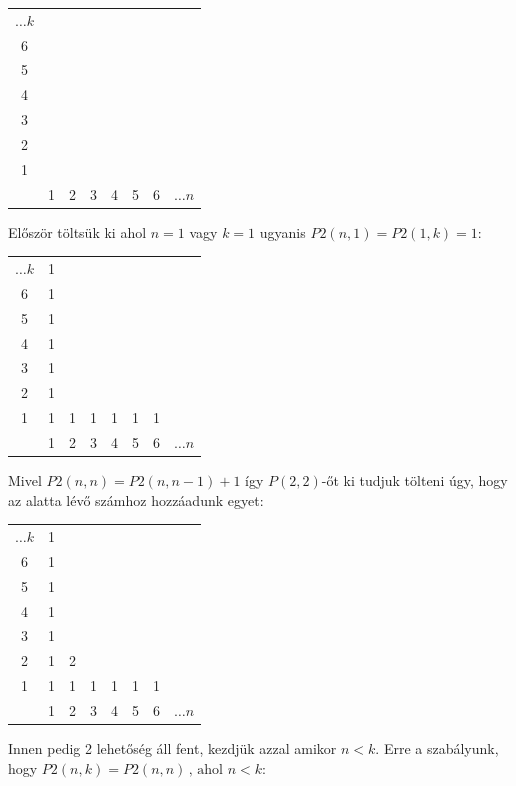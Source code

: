 \documentclass{article}
\theoremstyle{mytheoremstyle}
\theoremstyle{mytheoremstyle}
\theoremstyle{myproblemstyle}
\begin{document}
\begin{center}
    \begin{tabular}{c|ccccccc}
        $\ldots k$&\\
        6&\\
        5&\\
        4&\\
        3&\\
        2&\\
        1&\\
        \midrule&1&2&3&4&5&6& $\ldots n$ \\
    \end{tabular}
\end{center}
Először töltsük ki ahol $n=1$ vagy $k=1$ ugyanis 
$P2(n,1) = P2(1,k) = 1$:
\begin{center}
    \begin{tabular}{c|ccccccc}
        $\ldots k$&1&\\
        6&1&\\
        5&1&\\
        4&1&\\
        3&1&\\
        2&1&\\
        1&1&1&1&1&1&1\\
        \midrule&1&2&3&4&5&6& $\ldots n$ \\
    \end{tabular}
\end{center}
Mivel $P2(n,n) = P2(n,n-1) + 1$ így $P(2,2)$-őt ki tudjuk tölteni
úgy, hogy az alatta lévő számhoz hozzáadunk egyet:

\begin{center}
    \begin{tabular}{c|ccccccc}
        $\ldots k$&1&\\
        6&1&\\
        5&1&\\
        4&1&\\
        3&1&\\
        2&1&2\\
        1&1&1&1&1&1&1\\
        \midrule&1&2&3&4&5&6& $\ldots n$ \\
    \end{tabular}
\end{center}
Innen pedig 2 lehetőség áll fent, kezdjük azzal amikor $n<k$.
Erre a szabályunk, hogy $P2(n,k) = P2(n,n)\,\text{, ahol }n<k$:
\end{document}
